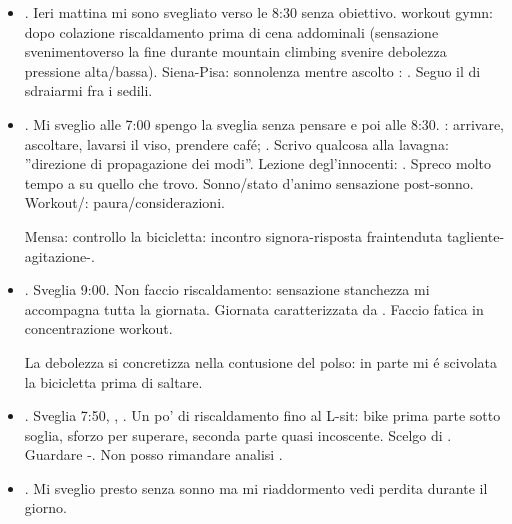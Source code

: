\begin{itemize}
\item {}. Ieri mattina mi sono svegliato verso le 8:30 senza obiettivo. workout gymn: dopo colazione riscaldamento prima di cena addominali (sensazione svenimentoverso la fine durante mountain climbing svenire debolezza pressione alta/bassa). Siena-Pisa: sonnolenza mentre ascolto : . Seguo il  di sdraiarmi fra i sedili.

\item {}. Mi sveglio alle 7:00 spengo la sveglia senza pensare e poi alle 8:30. : arrivare, ascoltare, lavarsi il viso, prendere caf\'e; . Scrivo qualcosa alla lavagna: ''direzione di propagazione dei modi''.
Lezione degl'innocenti: .
Spreco molto tempo a  su quello che trovo.
Sonno/stato d'animo sensazione post-sonno.
Workout/: paura/considerazioni.

Mensa: controllo la bicicletta: incontro signora-risposta fraintenduta tagliente-agitazione-.

\item {}. Sveglia 9:00. Non faccio riscaldamento: sensazione stanchezza mi accompagna tutta la giornata. Giornata caratterizzata da . Faccio fatica in concentrazione workout.

La debolezza si concretizza nella contusione del polso: in parte mi \'e scivolata la bicicletta prima di saltare.

\item {}. Sveglia 7:50, , . Un po' di riscaldamento fino al L-sit: bike prima parte sotto soglia, sforzo per superare, seconda parte quasi incoscente. Scelgo di . Guardare -. Non posso rimandare analisi .

\item {}. Mi sveglio presto senza sonno ma mi riaddormento vedi perdita  durante il giorno. 


\end{itemize}
